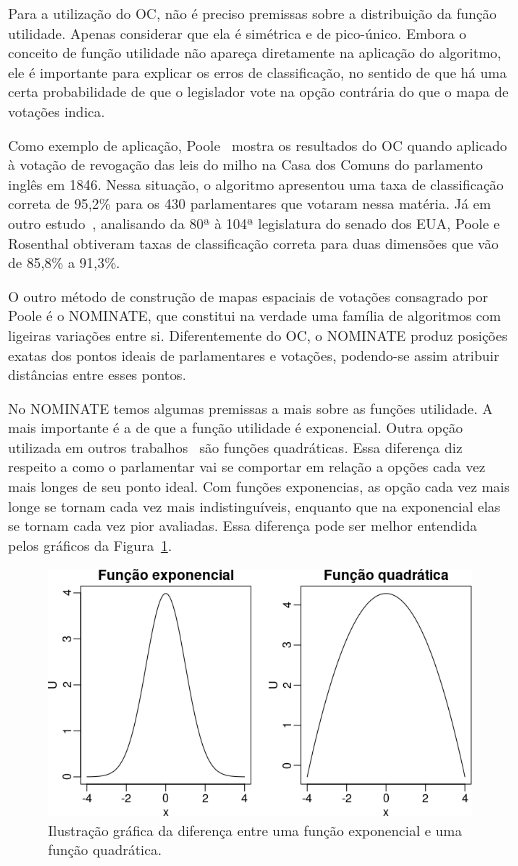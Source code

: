 \documentclass[a4paper, 12pt]{article}
\newcommand\nominate{NOMINATE\xspace}
\begin{document}
Para a utilização do OC, não é preciso premissas sobre a distribuição da função utilidade. Apenas considerar que ela é simétrica e de pico-único. Embora o conceito de função utilidade não apareça diretamente na aplicação do algoritmo, ele é importante para explicar os erros de classificação, no sentido de que há uma certa probabilidade de que o legislador vote na opção contrária do que o mapa de votações indica.

Como exemplo de aplicação, Poole~\cite{poole2005book} mostra os resultados do OC quando aplicado à votação de revogação das leis do milho na Casa dos Comuns do parlamento inglês em 1846. Nessa situação, o algoritmo apresentou uma taxa de classificação correta de 95,2\% para os 430 parlamentares que votaram nessa matéria. Já em outro estudo~\cite{poole-rosenthal2000}, analisando da 80ª à 104ª legislatura do senado dos EUA, Poole e Rosenthal obtiveram taxas de classificação correta para duas dimensões que vão de 85,8\% a 91,3\%.

O outro método de construção de mapas espaciais de votações consagrado por Poole é o \nominate, que constitui na verdade uma família de algoritmos com ligeiras variações entre si. Diferentemente do OC, o \nominate produz posições exatas dos pontos ideais de parlamentares e votações, podendo-se assim atribuir distâncias entre esses pontos. 

No \nominate temos algumas premissas a mais sobre as funções utilidade. A mais importante é a de que a função utilidade é exponencial. Outra opção utilizada em outros trabalhos~\cite{clinton2004ideal} são funções quadráticas. Essa diferença diz respeito a como o parlamentar vai se comportar em relação a opções cada vez mais longes de seu ponto ideal. Com funções exponencias, as opção cada vez mais longe se tornam cada vez mais indistinguíveis, enquanto que na exponencial elas se tornam cada vez pior avaliadas. Essa diferença pode ser melhor entendida pelos gráficos da Figura~\ref{fig:exponencial_quadratica}.

\begin{figure}[h!]
  \centering
  \includegraphics[scale=0.6]{figs/exponencial_quadratica.png}
  \caption{Ilustração gráfica da diferença entre uma função exponencial e uma função quadrática.}
  \label{fig:exponencial_quadratica}
\end{figure}
\end{document}
